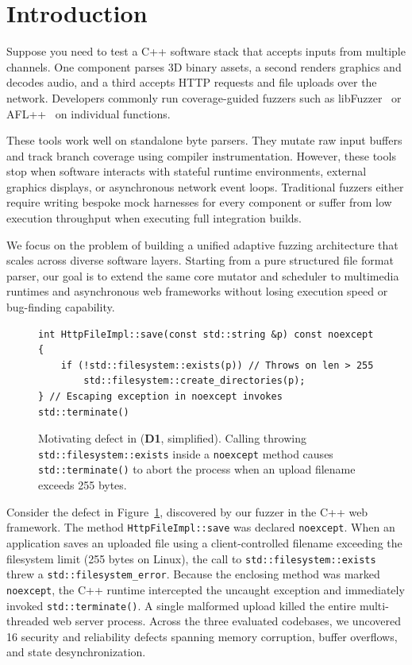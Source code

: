 \section{Introduction}
\label{sec:intro}

Suppose you need to test a C++ software stack that accepts inputs from multiple channels.
One component parses 3D binary assets, a second renders graphics and decodes audio, and a third accepts HTTP requests and file uploads over the network.
Developers commonly run coverage-guided fuzzers such as libFuzzer~\cite{serebryany2016libfuzzer} or AFL++~\cite{fioraldi2020aflplusplus} on individual functions.

These tools work well on standalone byte parsers.
They mutate raw input buffers and track branch coverage using compiler instrumentation.
However, these tools stop when software interacts with stateful runtime environments, external graphics displays, or asynchronous network event loops.
Traditional fuzzers either require writing bespoke mock harnesses for every component or suffer from low execution throughput when executing full integration builds.

We focus on the problem of building a unified adaptive fuzzing architecture that scales across diverse software layers.
Starting from a pure structured file format parser, our goal is to extend the same core mutator and scheduler to multimedia runtimes and asynchronous web frameworks without losing execution speed or bug-finding capability.

\begin{figure}[t]
\begin{lstlisting}[numbers=none,escapechar=@]
int HttpFileImpl::save(const std::string &p) const noexcept {
    if (!std::filesystem::exists(p)) // Throws on len > 255
        std::filesystem::create_directories(p);
} // Escaping exception in noexcept invokes std::terminate()
\end{lstlisting}
\caption{Motivating defect in \drogon (\textbf{D1}, simplified). Calling throwing \texttt{std::filesystem::exists} inside a \texttt{noexcept} method causes \texttt{std::terminate()} to abort the process when an upload filename exceeds 255 bytes.}
\label{fig:motivating}
\end{figure}

Consider the defect in Figure~\ref{fig:motivating}, discovered by our fuzzer in the \drogon C++ web framework.
The method \texttt{HttpFileImpl::save} was declared \texttt{noexcept}.
When an application saves an uploaded file using a client-controlled filename exceeding the filesystem limit (255 bytes on Linux), the call to \texttt{std::filesystem::exists} threw a \texttt{std::filesystem\_error}.
Because the enclosing method was marked \texttt{noexcept}, the C++ runtime intercepted the uncaught exception and immediately invoked \texttt{std::terminate()}.
A single malformed upload killed the entire multi-threaded web server process.
Across the three evaluated codebases, we uncovered 16 security and reliability defects spanning memory corruption, buffer overflows, and state desynchronization.

